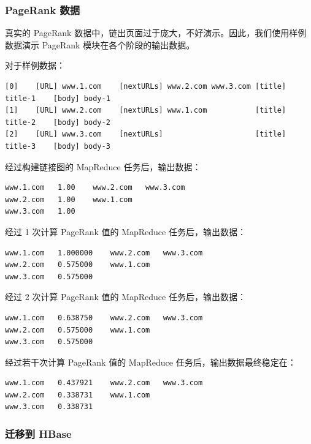 \documentclass{ctexart}
\begin{document}
    \subsubsection{PageRank 数据}\label{subsubsec:pagerank}

    真实的 PageRank 数据中，链出页面过于庞大，不好演示。因此，我们使用样例数据演示 PageRank 模块在各个阶段的输出数据。

    对于样例数据：

    \begin{lstlisting}[basicstyle=\ttfamily\footnotesize]
[0]    [URL] www.1.com    [nextURLs] www.2.com www.3.com [title] title-1    [body] body-1
[1]    [URL] www.2.com    [nextURLs] www.1.com           [title] title-2    [body] body-2
[2]    [URL] www.3.com    [nextURLs]                     [title] title-3    [body] body-3
    \end{lstlisting}

    经过构建链接图的 MapReduce 任务后，输出数据：

    \begin{lstlisting}
www.1.com	1.00	www.2.com	www.3.com
www.2.com	1.00	www.1.com
www.3.com	1.00
    \end{lstlisting}

    经过 1 次计算 PageRank 值的 MapReduce 任务后，输出数据：

    \begin{lstlisting}
www.1.com	1.000000	www.2.com	www.3.com
www.2.com	0.575000	www.1.com
www.3.com	0.575000
    \end{lstlisting}

    经过 2 次计算 PageRank 值的 MapReduce 任务后，输出数据：

    \begin{lstlisting}
www.1.com	0.638750	www.2.com	www.3.com
www.2.com	0.575000	www.1.com
www.3.com	0.575000
    \end{lstlisting}

    经过若干次计算 PageRank 值的 MapReduce 任务后，输出数据最终稳定在：

    \begin{lstlisting}
www.1.com	0.437921	www.2.com	www.3.com
www.2.com	0.338731	www.1.com
www.3.com	0.338731
    \end{lstlisting}

    \subsubsection{迁移到 HBase}\label{subsubsec:pagerank_migrate}
\end{document}
